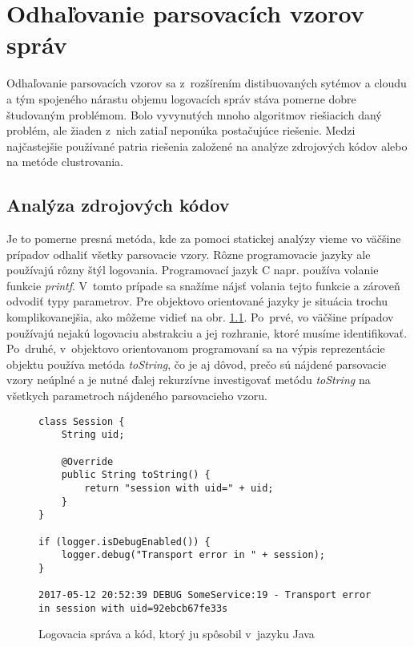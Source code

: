 \chapter{Odhaľovanie parsovacích vzorov správ}

Odhaľovanie parsovacích vzorov sa z~rozšírením distibuovaných sytémov a cloudu a tým spojeného nárastu objemu logovacích správ stáva pomerne dobre študovaným problémom. Bolo vyvynutých mnoho algoritmov riešiacich daný problém, ale žiaden z~nich zatiaľ neponúka postačujúce riešenie. Medzi najčastejšie používané patria riešenia založené na analýze zdrojových kódov alebo na metóde clustrovania.

\section{Analýza zdrojových kódov}

Je to pomerne presná metóda, kde za pomoci statickej analýzy vieme vo väčšine prípadov odhaliť všetky parsovacie vzory.
Rôzne programovacie jazyky ale používajú rôzny štýl logovania. Programovací jazyk C napr. používa volanie funkcie \emph{printf}.
V~tomto prípade sa snažíme nájsť volania tejto funkcie a zároveň odvodiť typy parametrov.
Pre objektovo orientované jazyky je situácia trochu komplikovanejšia, ako môžeme vidieť na obr. \ref{fig:static}. Po~prvé, vo väčšine prípadov používajú nejakú logovaciu abstrakciu a jej rozhranie, ktoré musíme identifikovať. Po~druhé, v~objektovo orientovanom programovaní sa na výpis reprezentácie objektu používa metóda \emph{toString}, čo je aj dôvod, prečo sú nájdené parsovacie vzory neúplné a je nutné ďalej rekurzívne investigovať metódu \emph{toString} na všetkych parametroch nájdeného parsovacieho vzoru.

\begin{figure}[htbp]
\centering
\begin{minipage}{0.9\textwidth}
\lstset{tabsize=4,columns=flexible,breaklines=true,breakatwhitespace=true, showstringspaces=false}
\begin{lstlisting}
class Session {
	String uid;
	
	@Override
	public String toString() {
		return "session with uid=" + uid;
	}
}

if (logger.isDebugEnabled()) {
	logger.debug("Transport error in " + session);
}

2017-05-12 20:52:39 DEBUG SomeService:19 - Transport error in session with uid=92ebcb67fe33s
\end{lstlisting} 		
\end{minipage}
\caption{Logovacia správa a kód, ktorý ju spôsobil v~jazyku Java}
\label{fig:static} 
\end{figure}

